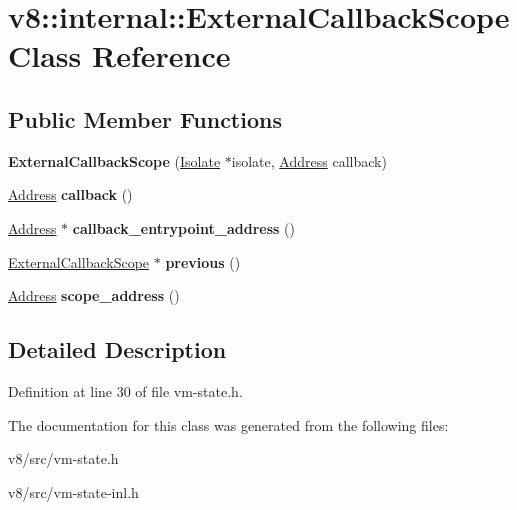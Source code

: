 \hypertarget{classv8_1_1internal_1_1ExternalCallbackScope}{}\section{v8\+:\+:internal\+:\+:External\+Callback\+Scope Class Reference}
\label{classv8_1_1internal_1_1ExternalCallbackScope}
\subsection*{Public Member Functions}
\begin{DoxyCompactItemize}
\item 
\mbox{\label{classv8_1_1internal_1_1ExternalCallbackScope_aef847e15343327c8ed8efa835d3dd195}} 
{\bfseries External\+Callback\+Scope} (\mbox{\hyperlink{classv8_1_1internal_1_1Isolate}{Isolate}} $\ast$isolate, \mbox{\hyperlink{classuintptr__t}{Address}} callback)
\item 
\mbox{\label{classv8_1_1internal_1_1ExternalCallbackScope_a337ee0bfd047821a77ed89e81ac22662}} 
\mbox{\hyperlink{classuintptr__t}{Address}} {\bfseries callback} ()
\item 
\mbox{\label{classv8_1_1internal_1_1ExternalCallbackScope_afe2b22c5a9c12126f2a1bb5f3a3640d3}} 
\mbox{\hyperlink{classuintptr__t}{Address}} $\ast$ {\bfseries callback\+\_\+entrypoint\+\_\+address} ()
\item 
\mbox{\label{classv8_1_1internal_1_1ExternalCallbackScope_a9e3e917c733693057a42d27b6962fd0a}} 
\mbox{\hyperlink{classv8_1_1internal_1_1ExternalCallbackScope}{External\+Callback\+Scope}} $\ast$ {\bfseries previous} ()
\item 
\mbox{\label{classv8_1_1internal_1_1ExternalCallbackScope_a2695387f0a7a35ab09f3e0329e6d31ca}} 
\mbox{\hyperlink{classuintptr__t}{Address}} {\bfseries scope\+\_\+address} ()
\end{DoxyCompactItemize}


\subsection{Detailed Description}


Definition at line 30 of file vm-\/state.\+h.



The documentation for this class was generated from the following files\+:\begin{DoxyCompactItemize}
\item 
v8/src/vm-\/state.\+h\item 
v8/src/vm-\/state-\/inl.\+h\end{DoxyCompactItemize}
